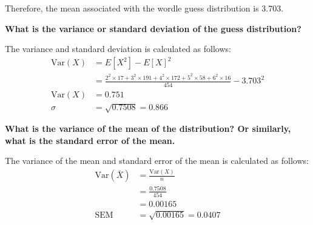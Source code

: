 \documentclass{article}
\begin{document}
Therefore, the mean associated with the wordle guess distribution is 3.703.

\textbf{What is the variance or standard deviation of the guess distribution?}

The variance and standard deviation is calculated as follows:
\begin{align*}
    \text{Var}(X) & = E[X^2] - E[X]^2 \\
    & = \frac{2^2 \times 17 + 3^2 \times 191 + 4^2 \times 172 + 5^2 \times 58 + 6^2 \times 16}{454} - 3.703^2 \\
    \text{Var}(X) &= \boxed{0.751} \\
    \sigma &= \sqrt{0.7508} = \boxed{0.866}
\end{align*}

\textbf{What is the variance of the mean of the distribution? Or similarly, what is the standard error of the mean.}

The variance of the mean and standard error of the mean is calculated as follows:
\begin{align*}
    \text{Var}(\bar{X}) & = \frac{\text{Var}(X)}{n} \\
    & = \frac{0.7508}{454} \\
    & = \boxed{0.00165} \\
    \text{SEM} &= \sqrt{0.00165} = \boxed{0.0407}
\end{align*}

\end{document}
